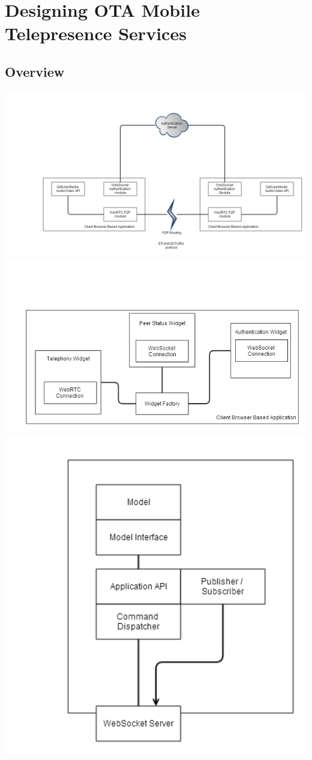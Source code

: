 \documentclass[a4paper,12pt]{report}
\begin{document}
\chapter{Designing OTA Mobile Telepresence Services}
\section{Overview}
\includegraphics[width=16cm]{NetworkModules}
\includegraphics[width=16cm]{WidgetStructure}
\includegraphics[width=16cm]{AuthServerOverview}
\end{document}
